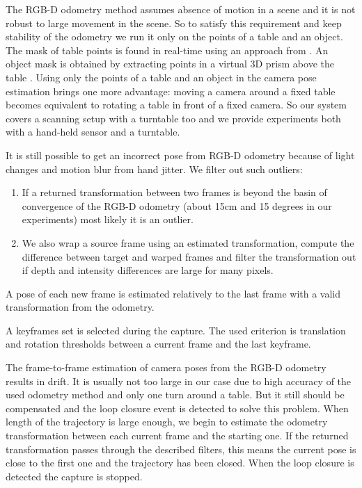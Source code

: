 \documentclass[letterpaper, 10 pt, conference]{ieeeconf}  %
\begin{document}
The RGB-D odometry method assumes absence of motion in a scene and it is not
robust to large movement in the scene. So to satisfy this requirement
and keep stability of the odometry we run it only
on the points of a table and an object. The mask of table points
is found in real-time using an approach from \cite{poppinga2008fast}. An object mask is
obtained by extracting points in a virtual 3D prism above the table \cite{rusu2009detecting}.
Using only the points
of a table and an object in the camera pose estimation brings one more advantage:
moving a camera around a fixed table becomes equivalent to rotating
a table in front of a fixed camera. So our system covers a scanning setup with a turntable too
and we provide experiments both with a hand-held sensor and a turntable.

It is still possible to get an incorrect pose from RGB-D odometry
because of light changes and motion blur from hand jitter.
We filter out such outliers:

\begin{enumerate}
 \item If a returned transformation between two frames is beyond the basin of convergence
 of the RGB-D odometry (about 15cm and 15 degrees in our experiments) most likely it is an outlier.
 \item We also wrap a source frame using an estimated transformation,
 compute the difference between target and warped frames 
 and filter the transformation out if
 depth and intensity differences are large for many pixels.
\end{enumerate}

A pose of each new frame is estimated relatively to the last frame
with a valid transformation from the odometry.

A keyframes set is selected during the capture.
The used criterion is translation and rotation thresholds 
between a current frame and the last keyframe.

The frame-to-frame estimation of camera poses from the RGB-D 
odometry results in drift. It is usually not too large in our case
due to high accuracy of the used odometry method \cite{steinbrucker2011real}
and only one turn around a table.
But it still should be compensated and the loop closure event is detected to solve this problem.
When length of the trajectory is large enough, we begin to estimate the
odometry transformation between each current frame and the starting one. 
If the returned transformation passes through the described filters, 
this means the current pose is close to the first one and 
the trajectory has been closed. When the loop closure is detected 
the capture is stopped.
\end{document}
